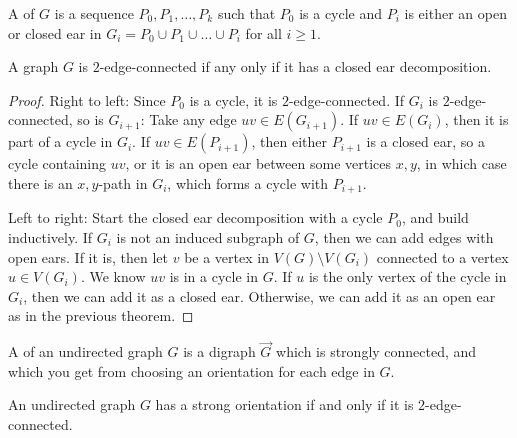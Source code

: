 \begin{definition}
  A  of $G$ is a sequence $P_0, P_1, \ldots,
  P_k$ such that $P_0$ is a cycle and $P_i$ is either an open or closed ear in
  $G_i = P_0 \cup P_1 \cup \ldots \cup P_i$ for all $i \ge 1$.
\end{definition}

\begin{theorem}
  A graph $G$ is $2$-edge-connected if any only if it has a closed ear decomposition.
\end{theorem}

\begin{proof}
  Right to left:
  Since $P_0$ is a cycle, it is $2$-edge-connected.
  If $G_i$ is $2$-edge-connected, so is $G_{i+1}$:
  Take any edge $uv \in E(G_{i+1})$.
  If $uv \in E(G_i)$, then it is part of a cycle in $G_i$.
  If $uv \in E(P_{i+1})$, then either $P_{i+1}$ is a closed ear, so a cycle
  containing $uv$, or it is an open ear between some vertices $x,y$, in which
  case there is an $x,y$-path in $G_i$, which forms a cycle with $P_{i+1}$.

  Left to right:
  Start the closed ear decomposition with a cycle $P_0$, and build inductively.
  If $G_i$ is not an induced subgraph of $G$, then we can add edges with open
  ears.
  If it is, then let $v$ be a vertex in $V(G) \setminus V(G_i)$ connected to a
  vertex $u \in V(G_i)$.
  We know $uv$ is in a cycle in $G$.
  If $u$ is the only vertex of the cycle in $G_i$, then we can add it as a
  closed ear.
  Otherwise, we can add it as an open ear as in the previous theorem.
\end{proof}


\begin{definition}
  A  of an undirected graph $G$ is a digraph $\vec{G}$
  which is strongly connected, and which you get from choosing an orientation
  for each edge in $G$.
\end{definition}

\begin{theorem}[Robbins]
  An undirected graph $G$ has a strong orientation if and only if it is
  $2$-edge-connected.
\end{theorem}

